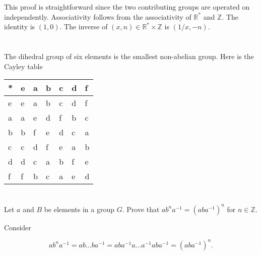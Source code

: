 \documentclass[a4paper]{article}
\begin{document}
This proof is straightforward since the two contributing groups are operated on independently. Associativity follows from the associativity of $\mathbb{R}^*$ and $\mathbb{Z}$. The identity is $(1,0)$. The inverse of $(x, n) \in \mathbb{R}^* \times \mathbb{Z}$ is $(1/x, -n)$.

\section{}

The dihedral group of six elements is the smallest non-abelian group. Here is the Cayley table

\begin{tabular}{ l | l l l l l l }
  * & e & a & b & c & d & f \\
  \hline      
  e & e & a & b & c & d & f \\
  a & a & e & d & f & b & c \\
  b & b & f & e & d & c & a \\
  c & c & d & f & e & a & b \\
  d & d & c & a & b & f & e \\
  f & f & b & c & a & e & d
\end{tabular}

\section{}


\section{}


\section{}


\section{}


\section{}


\section{}


\section{}



\section{}


\section{}

Let $a$ and $B$ be elements in a group $G$. Prove that $ab^na^{-1} = (aba^{-1})^n$ for $n \in \mathbb{Z}$.

\vspace{\baselineskip}

Consider

$$ab^na^{-1} = a b ... b  a^{-1} = a  b a^{-1} a ... a^{-1} a b a^{-1} = (aba^{-1})^n.$$
\end{document}
